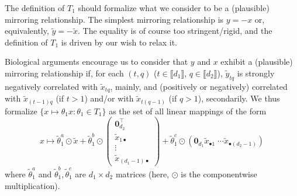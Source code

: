 The  definition  of  $T_{1}$  should  formalize  what  we  consider  to  be  a
(plausible) mirroring  relationship.  The  simplest mirroring  relationship is
$y  = -x$  or, equivalently,  $\tilde{y} =  -\tilde{x}$.  The  equality is  of
course too  stringent/rigid, and the  definition of  $T_{1}$ is driven  by our
wish to relax it.

Biological  arguments encourage  us to  consider that  $y$ and  $x$ exhibit  a
(plausible)     mirroring     relationship     if,    for     each     $(t,q)$
($t  \in \llbracket  d_{1}\rrbracket$,  $q  \in \llbracket  d_{2}\rrbracket$),
$\tilde{y}_{tq}$  is  strongly  negatively correlated  with  $\tilde{x}_{tq}$,
mainly, and  (positively or  negatively) correlated  with $\tilde{x}_{(t-1)q}$
(if $t>1$) and/or with $\tilde{x}_{t(q-1)}$  (if $q>1$), secondarily.  We thus
formalize $\{x  \mapsto \theta_{1} x :  \theta_{1} \in T_{1}\}$ as  the set of
all linear mappings of the form
\begin{equation*}
  x  \mapsto \tilde{\theta}_{1}^{a}  \odot \tilde{x}  + \tilde{\theta}_{1}^{b}
  \odot \left(%
    \begin{smallmatrix}
      \textbf{0}_{d_{2}}^{\top}\\\tilde{x}_{1\bullet}\\\vdots\\\tilde{x}_{(d_{1}-1)\bullet}
    \end{smallmatrix}\right) %
  + \tilde{\theta}_{1}^{c}
  \odot \left(%
    \textbf{0}_{d_{1}}
    \tilde{x}_{\bullet 1} \; \cdots \tilde{x}_{\bullet (d_{2}-1)} \right) 
\end{equation*}
where                       $\tilde{\theta}_{1}^{a}$                       and
$\tilde{\theta}_{1}^{b},   \tilde{\theta}_{1}^{c}$  are   $d_{1}\times  d_{2}$
matrices (here, $\odot$ is the componentwise multiplication). 

